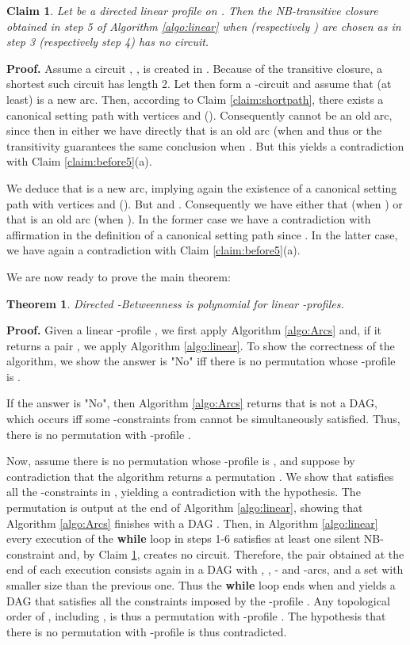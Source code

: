 \documentclass{article}
\newtheorem{thm}{Theorem}
\newtheorem{fait}{Claim}
\newcommand{\bfn}{\begin{fait}}
\newcommand{\efn}{\end{fait}}
\begin{document}
\bfn
Let  be a directed linear profile on  . Then 
the NB-transitive closure  obtained in step  5 of Algorithm \ref{algo:linear} 
when  (respectively ) are chosen as in step 3 (respectively step 4) has no circuit.
\label{claim:circuit}
\efn


{\bf Proof.} Assume a circuit , , is created in . Because of
the transitive closure, a shortest such circuit has length 2. Let then  form
a -circuit and
assume that (at least)  is a new arc. Then, according to Claim \ref{claim:shortpath},
there exists a canonical setting path with vertices  and 
  ().  
Consequently  cannot be an old arc, since then
in  either we have directly that  is an old arc (when  and thus 
or the transitivity guarantees the same conclusion when . But this  yields  a contradiction 
with Claim \ref{claim:before5}(a).

We deduce that  is a new arc, implying again the existence of a canonical setting path
with vertices  and   ().
But  and . Consequently  we have either that  (when ) or
 that  is an old arc (when ). In the former case we have a contradiction
with affirmation  in the definition of a canonical setting path since . In the latter case, we have again a contradiction with Claim \ref{claim:before5}(a). 
\bigskip

We are now ready to prove the main theorem:
 
 \begin{thm}
 {\sc Directed -Betweenness} is polynomial for linear -profiles.
 \end{thm}

{\bf Proof.} Given a linear -profile , we first apply Algorithm \ref{algo:Arcs} and,
if it returns a pair , we apply Algorithm \ref{algo:linear}. To  show the correctness
of the algorithm, we show the answer is "No" iff there is no permutation whose -profile is .

If the answer is "No", then Algorithm \ref{algo:Arcs} returns that  is not a DAG, which occurs
iff some -constraints from  cannot be simultaneously satisfied. Thus, there is no permutation 
with -profile .

Now, assume there is no permutation whose -profile is , and suppose by contradiction that
the algorithm returns a permutation . We show that  satisfies all the -constraints in , 
yielding a contradiction with the hypothesis. The permutation  is output at the end of Algorithm \ref{algo:linear},
showing that Algorithm \ref{algo:Arcs} finishes with a DAG . 
Then, in
Algorithm \ref{algo:linear} every execution of the {\bf while} loop in steps 1-6 satisfies at least
one silent NB-constraint and, by Claim \ref{claim:circuit}, creates no circuit. Therefore, 
the pair  obtained at the end of each execution consists again in a DAG  
with , , - and -arcs, and a set  with smaller size than the previous one.
Thus the {\bf while} loop ends when  and yields a DAG  that satisfies
all the constraints imposed by the -profile . Any topological order of , including , is thus
a permutation with -profile . The hypothesis that there is no permutation with
-profile  is thus contradicted.
\end{document}
